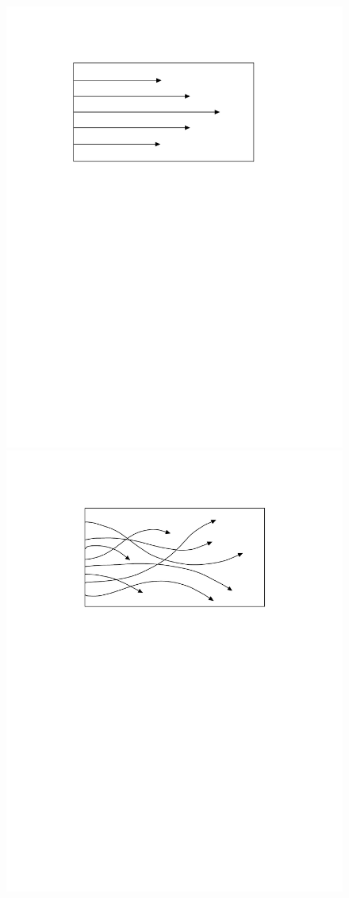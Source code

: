 \begin{figure}[h!]
\begin{center}
\includegraphics[scale=0.5]{figures/laminar}
\includegraphics[scale=0.503]{figures/turbulent}

\end{center}
\end{figure}
